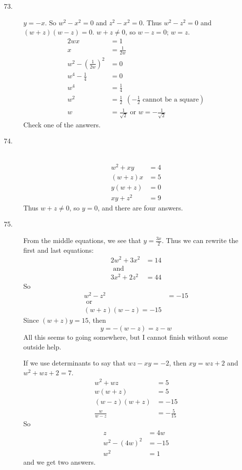 \documentclass{article}
\begin{document}
\begin{description}
  \item[73.] $y = -x$. So $w^2 - x^2 = 0$ and $z^2 - x^2 = 0$. Thus $w^2 - z^2 = 0$ and $(w+z)(w-z) = 0$. $w+z \neq 0$, so $w-z = 0$; $w=z$.
    \begin{align*}
    2wx & = 1 \\
    x & = \frac{1}{2w} \\
    w^2 - \left( \frac{1}{2w} \right)^2 & = 0 \\
    w^4 - \frac{1}{4} & = 0 \\
    w^4 & = \frac{1}{4} \\
    w^2 & = \frac{1}{2}\ \ \left( -\frac{1}{2} \text{ cannot be a square} \right) \\
    w & = \frac{1}{\sqrt{2}} \text{ or } w = -\frac{1}{\sqrt{2}}
    \end{align*}
    Check one of the answers.

  \item[74.] $\ $
    \begin{align*}
    w^2 + xy & = 4 \\
     (w+z) x & = 5 \\ 
     y (w+z) & = 0 \\
    xy + z^2 & = 9
    \end{align*}
    Thus $w+z \neq 0$, so $y=0$, and there are four answers.

  \item[75.] From the middle equations, we see that $y = \frac{3x}{2}$. Thus we can rewrite the first and last equations:
    \begin{align*}
    2w^2 + 3x^2 & = 14 \\
    \text{ and } & \\
    3x^2 + 2z^2 & = 44
    \end{align*}
    So
    \begin{align*}
    w^2 - z^2 & = -15 \\
    \text{ or } & \\
    (w+z) (w-z) = -15
    \end{align*}
    Since $(w+z)y = 15$, then
    \begin{equation*}
    y = -(w-z) = z - w
    \end{equation*}
    All this seems to going somewhere, but I cannot finish without some outside help.

    If we use determinants to say that $wz - xy = -2$, then $xy = wz + 2$ and $w^2 + wz + 2 = 7$.
    \begin{align*}
         w^2 + wz & = 5 \\
          w (w+z) & = 5 \\
      (w-z) (w+z) & = -15 \\
    \frac{w}{w-z} & = -\frac{5}{15}
    \end{align*}
    So
    \begin{align*}
    z & = 4w \\
    w^2 - (4w)^2 & = -15 \\
    w^2 & = 1
    \end{align*}
    and we get two answers.


\end{description}
\end{document}
